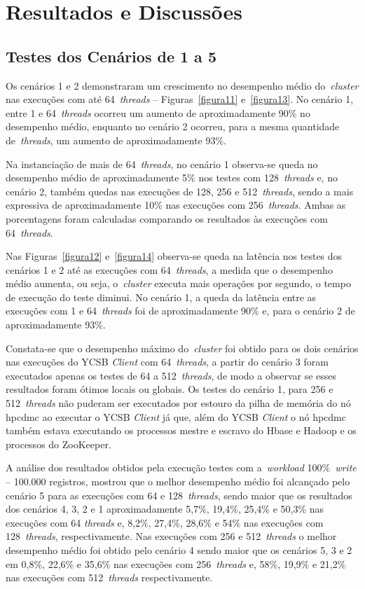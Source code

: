 \documentclass[12pt]{article}
\begin{document}
\section{Resultados e Discussões}
\label{sec:resultados}

\subsection{Testes dos Cenários de 1 a 5}

Os cenários 1 e 2 demonstraram um crescimento no desempenho médio do~\emph{cluster} nas execuções com até 64~\emph{threads} -- Figuras~\ref{figura11} e~\ref{figura13}. 
No cenário 1, entre 1 e 64~\emph{threads} ocorreu um aumento de aproximadamente 90\% no desempenho médio, enquanto no cenário 2 ocorreu, para a mesma quantidade de~\emph{threads}, um aumento de aproximadamente 93\%.

Na instanciação de mais de 64~\emph{threads}, no cenário 1 observa-se queda no desempenho médio de aproximadamente 5\% nos testes com 128~\emph{threads} e, no cenário 2, também quedas nas execuções de 128, 256 e 512~\emph{threads}, sendo a mais expressiva de aproximadamente 10\% nas execuções com 256~\emph{threads}. 
Ambas as porcentagens foram calculadas comparando os resultados às execuções com 64~\emph{threads}.

Nas Figuras~\ref{figura12} e~\ref{figura14} observa-se queda na latência nos testes dos cenários 1 e 2 até as execuções com 64~\emph{threads}, a medida que o desempenho médio aumenta, ou seja, o~\emph{cluster} executa mais operações por segundo, o tempo de execução do teste diminui. No cenário 1, a queda da latência entre as execuções com 1 e 64~\emph{threads} foi de aproximadamente 90\% e, para o cenário 2 de aproximadamente 93\%.

Constata-se que o desempenho máximo do~\emph{cluster} foi obtido para os dois cenários nas execuções do YCSB \textit{Client} com 64~\emph{threads}, a partir do cenário 3 foram executados apenas os testes de 64 a 512~\emph{threads}, de modo a observar se esses resultados foram ótimos locais ou globais. Os testes do cenário 1, para 256 e 512~\emph{threads} não puderam ser executados por estouro da pilha de memória do nó hpcdmc ao executar o YCSB \textit{Client} já que, além do YCSB \textit{Client} o nó hpcdmc também estava executando os processos mestre e escravo do Hbase e Hadoop e os processos do ZooKeeper.

A análise dos resultados obtidos pela execução testes com a~\emph{workload} 100\%~\emph{write} -- 100.000 registros, mostrou que o melhor desempenho médio foi alcançado pelo cenário 5 para as execuções com 64 e 128~\emph{threads}, sendo maior que os resultados dos cenários 4, 3, 2 e 1 aproximadamente 5,7\%, 19,4\%, 25,4\% e 50,3\% nas execuções com 64 \emph{threads} e, 8,2\%, 27,4\%, 28,6\% e 54\% nas execuções com 128~\emph{threads}, respectivamente. 
Nas execuções com 256 e 512~\emph{threads} o melhor desempenho médio foi obtido pelo cenário 4 sendo maior que os cenários 5, 3 e 2 em 0,8\%, 22,6\% e 35,6\% nas execuções com 256~\emph{threads} e, 58\%, 19,9\% e 21,2\% nas execuções com 512~\emph{threads} respectivamente.
\end{document}
